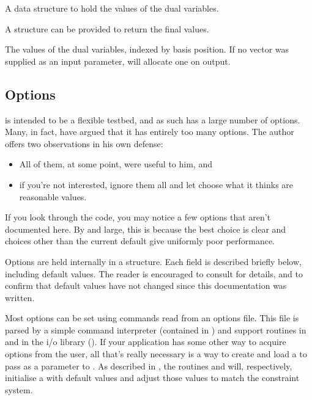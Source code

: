 \begin{codedoc}
  \item{} A data structure to hold the values of the dual variables.
  \begin{description}[\textbf{(o)}]
    \item[\textbf{(i)}]
    A structure can be provided to return the final values.

    \item[\textbf{(o)}]
    The values of the dual variables, indexed by basis position.
    If no vector was supplied as an input parameter, \dylp will allocate
    one on output.
  \end{description}
\end{codedoc}


\subsection{\dylp Options}
\label{sec:DylpOptions}

\dylp is intended to be a flexible testbed, and as such has a large number of
options.
Many, in fact, have argued that it has entirely too many options.
The author offers two observations in his own defense:
\begin{itemize}
  \item
  All of them, at some point, were useful to him, and
  
  \item
  if you're not interested, ignore them all and
  let \dylp choose what it thinks are reasonable values.
\end{itemize}
If you look through the code, you may notice a few options that aren't
documented here.
By and large, this is because the best choice is clear and choices
other than the current default give uniformly poor performance.

Options are held internally in a  structure.
Each field is described briefly below, including default values.
The reader is encouraged to consult  for details, and
 to confirm that default values have not changed since
this documentation was written.

Most options can be set using commands read from an options file.
This file is parsed by a simple command interpreter (contained
in ) and support routines in  and
in the i/o library (\vid {}).
If your application has some other way to acquire options from the user,
all that's really necessary is a way to create and load
a  to pass as a parameter to .
As described in , the routines
 and  will, respectively, initialise
a  with default values and adjust those values to match
the constraint system.

